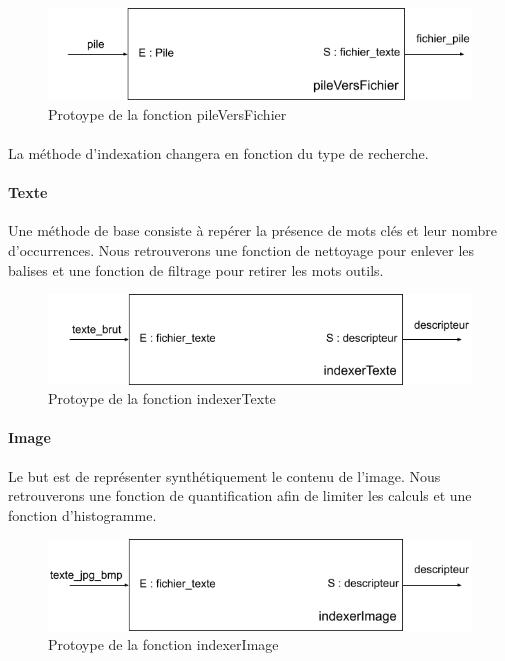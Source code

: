 \documentclass[../main.tex]{subfiles}
\begin{document}
    \begin{figure}[H]
        \centering
        \includegraphics[width=140mm]{diagrams/pile_vers_fichier.png}
        \caption{Protoype de la fonction pileVersFichier}\label{desc:pvf}
    \end{figure}


    \paragraph{}
    La méthode d'indexation changera en fonction du type de recherche.
    
    \paragraph{Texte}
    Une méthode de base consiste à repérer la présence de mots clés et leur nombre d'occurrences. Nous retrouverons une fonction de nettoyage pour enlever les balises et une fonction de filtrage pour retirer les mots outils.

    \begin{figure}[H]
        \centering
        \includegraphics[width=140mm]{diagrams/indexer_texte.png}
        \caption{Protoype de la fonction indexerTexte}
    \end{figure}
    
    \paragraph{Image}
    Le but est de représenter synthétiquement le contenu de l’image. Nous retrouverons une fonction de quantification afin de limiter les calculs et une fonction d’histogramme.

    \begin{figure}[H]
        \centering
        \includegraphics[width=140mm]{diagrams/indexer_image.png}
        \caption{Protoype de la fonction indexerImage}
    \end{figure}
    
\end{document}
